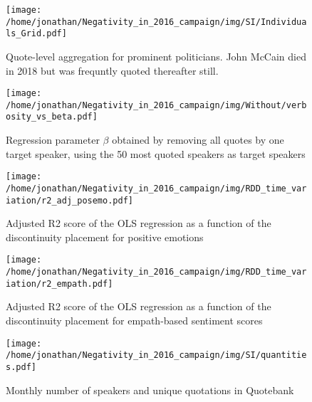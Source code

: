 \begin{figure}[h]\centering
	\texttt{[image: /home/jonathan/Negativity\_in\_2016\_campaign/img/SI/Individuals\_Grid.pdf]}
	\caption{Quote-level aggregation for prominent politicians. John McCain died in 2018 but was frequntly quoted thereafter still.}
	\label{fig: SI_8}
\end{figure}



\begin{figure}[h]\centering
	\texttt{[image: /home/jonathan/Negativity\_in\_2016\_campaign/img/Without/verbosity\_vs\_beta.pdf]}
	\caption{Regression parameter $\beta$ obtained by removing all quotes by one target speaker, using the 50 most quoted speakers as target speakers}
	\label{fig: SI_9}
\end{figure}



\begin{figure}[h]\centering
	\texttt{[image: /home/jonathan/Negativity\_in\_2016\_campaign/img/RDD\_time\_variation/r2\_adj\_posemo.pdf]}
	\caption{Adjusted R2 score of the OLS regression as a function of the discontinuity placement for positive emotions}
	\label{fig: SI_10}
\end{figure}



\begin{figure}[h]\centering
	\texttt{[image: /home/jonathan/Negativity\_in\_2016\_campaign/img/RDD\_time\_variation/r2\_empath.pdf]}
	\caption{Adjusted R2 score of the OLS regression as a function of the discontinuity placement for empath-based sentiment scores}
	\label{fig: SI_11}
\end{figure}



\begin{figure}[h]\centering
	\texttt{[image: /home/jonathan/Negativity\_in\_2016\_campaign/img/SI/quantities.pdf]}
	\caption{Monthly number of speakers and unique quotations in Quotebank}
	\label{fig: SI_12}
\end{figure}



\clearpage
\pagebreak
